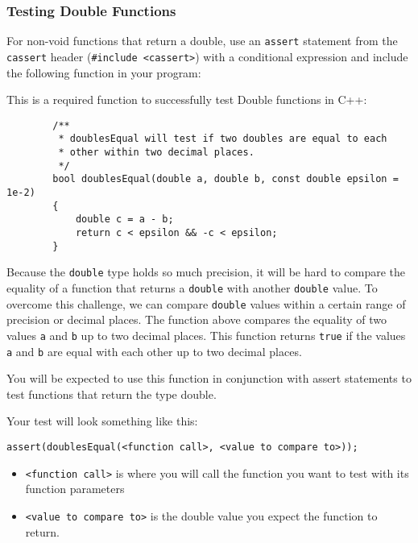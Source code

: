 \subsubsection{Testing Double Functions}
For non-void functions that return a double, use an \texttt{assert} statement from the \texttt{cassert} header (\texttt{#include <cassert>}) with a conditional expression and include the following function in your program:

\begin{example}
    This is a required function to successfully test Double functions in C++:
    \begin{verbatim}
        /**
         * doublesEqual will test if two doubles are equal to each 
         * other within two decimal places.
         */
        bool doublesEqual(double a, double b, const double epsilon = 1e-2)
        {
            double c = a - b;
            return c < epsilon && -c < epsilon;
        }
    \end{verbatim}
\end{example}

Because the \texttt{double} type holds so much precision, it will be hard to compare the equality of a function that returns a \texttt{double} with another \texttt{double} value. To overcome this challenge, we can compare \texttt{double} values within a certain range of precision or decimal places. The function above compares the equality of two values \texttt{a} and \texttt{b} up to two decimal places. This function returns \texttt{true} if the values \texttt{a} and \texttt{b} are equal with each other up to two decimal places.

You will be expected to use this function in conjunction with assert statements to test functions that return the type double.

Your test will look something like this:

\texttt{assert(doublesEqual(<function call>, <value to compare to>));}

\begin{itemize}
    \item \texttt{<function call>} is where you will call the function you want to test with its function parameters
    \item \texttt{<value to compare to>} is the double value you expect the function to return.
\end{itemize}

